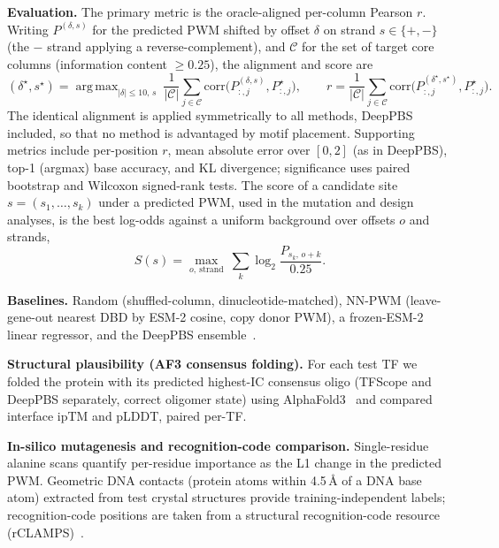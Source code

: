 \documentclass[11pt,letterpaper]{article}
\DeclareMathOperator*{\argmax}{arg\,max}\DeclareMathOperator*{\argmin}{arg\,min}
\begin{document}
\noindent\textbf{Evaluation.} The primary metric is the oracle-aligned per-column Pearson $r$.
Writing $P^{(\delta,s)}$ for the predicted PWM shifted by offset $\delta$ on strand
$s\in\{+,-\}$ (the $-$ strand applying a reverse-complement), and $\mathcal{C}$ for the set of
target core columns (information content $\geq0.25$), the alignment and score are
\begin{equation}
(\delta^\star,s^\star)=\!\!\argmax_{|\delta|\leq 10,\,s}\ \frac{1}{|\mathcal{C}|}\!\sum_{j\in\mathcal{C}}\!
\mathrm{corr}\!\big(P^{(\delta,s)}_{:,j},P^\star_{:,j}\big),\qquad
r=\frac{1}{|\mathcal{C}|}\sum_{j\in\mathcal{C}}\mathrm{corr}\!\big(P^{(\delta^\star,s^\star)}_{:,j},P^\star_{:,j}\big).
\end{equation}
The identical alignment is applied symmetrically to all methods, DeepPBS included, so that no method
is advantaged by motif placement. Supporting metrics include per-position $r$, mean absolute error
over $[0,2]$ (as in DeepPBS), top-1 (argmax) base accuracy, and KL divergence; significance uses
paired bootstrap and Wilcoxon signed-rank tests. The score of a candidate site $s=(s_1,\dots,s_k)$
under a predicted PWM, used in the mutation and design analyses, is the best log-odds against a
uniform background over offsets $o$ and strands,
\begin{equation}
S(s)=\max_{o,\ \mathrm{strand}}\ \sum_{k} \log_2\!\frac{P_{s_k,\,o+k}}{0.25}.
\end{equation}

\noindent\textbf{Baselines.} Random (shuffled-column, dinucleotide-matched), NN-PWM (leave-gene-out
nearest DBD by ESM-2 cosine, copy donor PWM), a frozen-ESM-2 linear regressor, and the DeepPBS
ensemble~\cite{Mitra2024}.

\noindent\textbf{Structural plausibility (AF3 consensus folding).} For each test TF we folded the
protein with its predicted highest-IC consensus oligo (TFScope and DeepPBS separately, correct
oligomer state) using AlphaFold3~\cite{Jumper2021} and compared interface ipTM and pLDDT, paired
per-TF.

\noindent\textbf{In-silico mutagenesis and recognition-code comparison.} Single-residue alanine
scans quantify per-residue importance as the L1 change in the predicted PWM. Geometric DNA contacts
(protein atoms within 4.5\,\AA{} of a DNA base atom) extracted from test crystal structures provide
training-independent labels; recognition-code positions are taken from a structural
recognition-code resource (rCLAMPS)~\cite{Wolfe2000,Najafabadi2015}.
\end{document}

